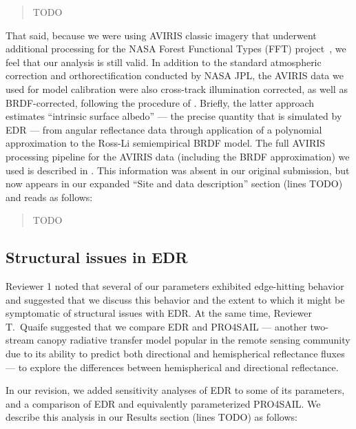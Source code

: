 \documentclass{article}
\begin{document}
\begin{quote}

  TODO

\end{quote}

That said, because we were using AVIRIS classic imagery that underwent additional processing for the NASA Forest Functional Types (FFT) project~\citep{singh2015imaging}, we feel that our analysis is still valid.
In addition to the standard atmospheric correction and orthorectification conducted by NASA JPL, the AVIRIS data we used for model calibration were also cross-track illumination corrected, as well as BRDF-corrected, following the procedure of \citet{lucht2000algorithm}.
Briefly, the latter approach estimates “intrinsic surface albedo” --- the precise quantity that is simulated by EDR --- from angular reflectance data through application of a polynomial approximation to the Ross-Li semiempirical BRDF model.
The full AVIRIS processing pipeline for the  AVIRIS data (including the BRDF approximation) we used is described in \citet{singh2015imaging}.
This information was absent in our original submission, but now appears in our expanded ``Site and data description'' section (lines TODO) and reads as follows:

\begin{quote}

  TODO

\end{quote}

\subsection{Structural issues in EDR}\label{subsec:structural}

Reviewer 1 noted that several of our parameters exhibited edge-hitting behavior and suggested that we discuss this behavior and the extent to which it might be symptomatic of structural issues with EDR.\@
At the same time, Reviewer T.\ Quaife suggested that we compare EDR and PRO4SAIL --- another two-stream canopy radiative transfer model popular in the remote sensing community due to its ability to predict both directional and hemispherical reflectance fluxes --- to explore the differences between hemispherical and directional reflectance.

In our revision, we added sensitivity analyses of EDR to some of its parameters, and a comparison of EDR and equivalently parameterized PRO4SAIL.\@
We describe this analysis in our Results section (lines TODO) as follows:
\end{document}
